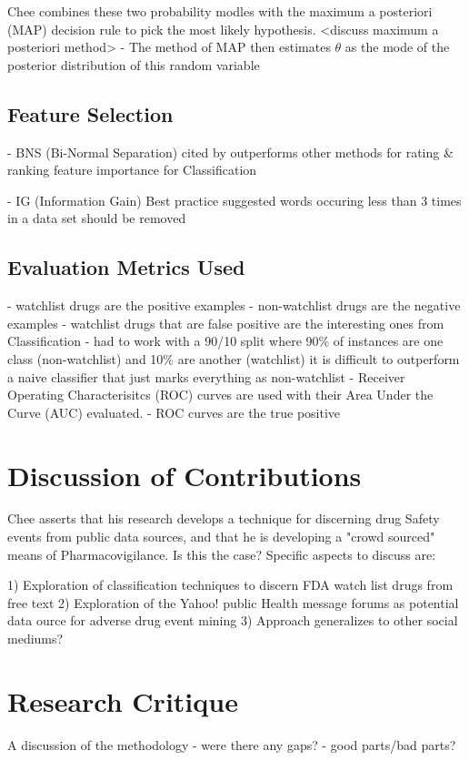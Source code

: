 \documentclass[twoside,11pt]{article}
\begin{document}
Chee combines these two probability modles with the maximum a posteriori (MAP)
decision rule to pick the most likely hypothesis.
<discuss maximum a posteriori method>
- The method of MAP then estimates $\theta$ as the mode of the posterior
distribution of this random variable


\subsection{Feature Selection}
- BNS (Bi-Normal Separation) cited by \citep{Forman}
outperforms other methods for rating & ranking feature importance for Classification

- IG (Information Gain)
Best practice suggested words occuring less than 3 times in a data set should be removed

\subsection{Evaluation Metrics Used}
- watchlist drugs are the positive examples
- non-watchlist drugs are the negative examples
- watchlist drugs that are false positive are the interesting ones from Classification
- had to work with a 90/10 split where 90\% of instances are one class (non-watchlist) and 10\% are another
(watchlist) it is difficult to outperform a naive classifier that just marks everything as non-watchlist
- Receiver Operating Characterisitcs (ROC) curves are used with their Area Under the Curve (AUC)
evaluated.
- ROC curves are the true positive



\section{Discussion of Contributions}
Chee asserts that his research develops a technique for discerning drug Safety
events from public data sources, and that he is developing a "crowd sourced"
means of Pharmacovigilance.  Is this the case? Specific aspects to discuss are:

1) Exploration of classification techniques to discern FDA watch list drugs from
free text
2) Exploration of the Yahoo! public Health message forums as  potential
data ource for adverse drug event mining
3) Approach generalizes to other social mediums?


\section{Research Critique}
A discussion of the methodology
- were there any gaps?
- good parts/bad parts?
\end{document}

